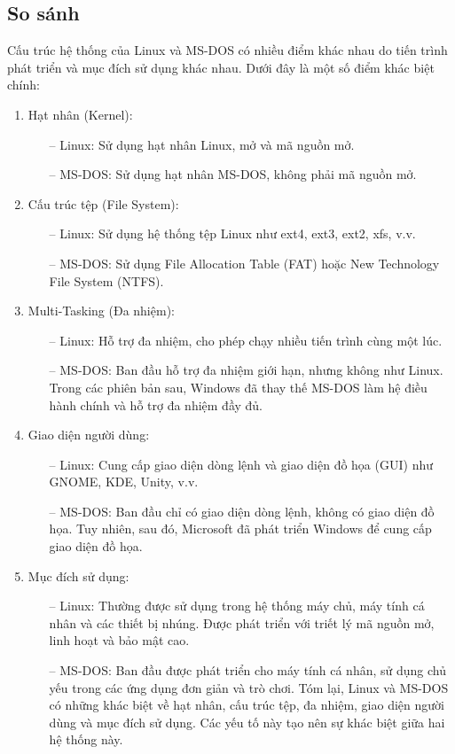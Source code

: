 \documentclass[12pt,a4paper]{article}
\begin{document}
\subsection{So sánh}
Cấu trúc hệ thống của Linux và MS-DOS có nhiều điểm khác nhau do tiến trình phát triển và mục đích sử dụng khác nhau. Dưới đây là một số điểm khác biệt chính:
\begin{enumerate}
	\item Hạt nhân (Kernel):
	\begin{itemize}
		\item [--] Linux: Sử dụng hạt nhân Linux, mở và mã nguồn mở.
		\item [--] MS-DOS: Sử dụng hạt nhân MS-DOS, không phải mã nguồn mở.
	\end{itemize}
	\item Cấu trúc tệp (File System):
	\begin{itemize}
		\item [--] Linux: Sử dụng hệ thống tệp Linux như ext4, ext3, ext2, xfs, v.v.
		\item [--] MS-DOS: Sử dụng File Allocation Table (FAT) hoặc New Technology File System (NTFS).
	\end{itemize}
	\item Multi-Tasking (Đa nhiệm):
		\begin{itemize}
		\item [--] Linux: Hỗ trợ đa nhiệm, cho phép chạy nhiều tiến trình cùng một lúc.
		\item [--] MS-DOS: Ban đầu hỗ trợ đa nhiệm giới hạn, nhưng không như Linux. Trong các phiên bản sau, Windows đã thay thế MS-DOS làm hệ điều hành chính và hỗ trợ đa nhiệm đầy đủ.
	\end{itemize}
	\item Giao diện người dùng:
		\begin{itemize}
		\item [--] Linux: Cung cấp giao diện dòng lệnh và giao diện đồ họa (GUI) như GNOME, KDE, Unity, v.v.
		\item [--] MS-DOS: Ban đầu chỉ có giao diện dòng lệnh, không có giao diện đồ họa. Tuy nhiên, sau đó, Microsoft đã phát triển Windows để cung cấp giao diện đồ họa.
	\end{itemize}
	\item Mục đích sử dụng:
		\begin{itemize}
		\item [--] Linux: Thường được sử dụng trong hệ thống máy chủ, máy tính cá nhân và các thiết bị nhúng. Được phát triển với triết lý mã nguồn mở, linh hoạt và bảo mật cao.
		\item [--] MS-DOS: Ban đầu được phát triển cho máy tính cá nhân, sử dụng chủ yếu trong các ứng dụng đơn giản và trò chơi. Tóm lại, Linux và MS-DOS có những khác biệt về hạt nhân, cấu trúc tệp, đa nhiệm, giao diện người dùng và mục đích sử dụng. Các yếu tố này tạo nên sự khác biệt giữa hai hệ thống này.
	\end{itemize}
\end{enumerate}
\end{document}
